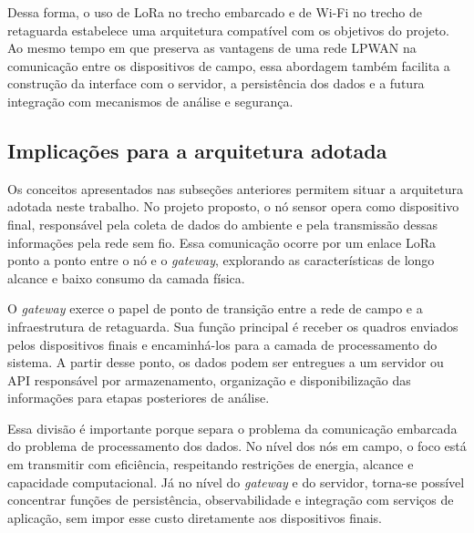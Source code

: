 Dessa forma, o uso de LoRa no trecho embarcado e de Wi-Fi no trecho de retaguarda estabelece uma arquitetura compatível com os objetivos do projeto. Ao mesmo tempo em que preserva as vantagens de uma rede LPWAN na comunicação entre os dispositivos de campo, essa abordagem também facilita a construção da interface com o servidor, a persistência dos dados e a futura integração com mecanismos de análise e segurança.


\subsection{Implicações para a arquitetura adotada}
\label{subsec:implicacoes_arquitetura}

Os conceitos apresentados nas subseções anteriores permitem situar a arquitetura adotada neste trabalho. No projeto proposto, o nó sensor opera como dispositivo final, responsável pela coleta de dados do ambiente e pela transmissão dessas informações pela rede sem fio. Essa comunicação ocorre por um enlace LoRa ponto a ponto entre o nó e o \textit{gateway}, explorando as características de longo alcance e baixo consumo da camada física.

O \textit{gateway} exerce o papel de ponto de transição entre a rede de campo e a infraestrutura de retaguarda. Sua função principal é receber os quadros enviados pelos dispositivos finais e encaminhá-los para a camada de processamento do sistema. A partir desse ponto, os dados podem ser entregues a um servidor ou API responsável por armazenamento, organização e disponibilização das informações para etapas posteriores de análise.

Essa divisão é importante porque separa o problema da comunicação embarcada do problema de processamento dos dados. No nível dos nós em campo, o foco está em transmitir com eficiência, respeitando restrições de energia, alcance e capacidade computacional. Já no nível do \textit{gateway} e do servidor, torna-se possível concentrar funções de persistência, observabilidade e integração com serviços de aplicação, sem impor esse custo diretamente aos dispositivos finais.

